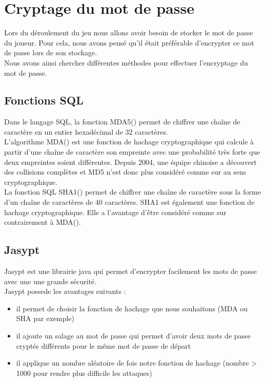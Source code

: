 \section{Cryptage du mot de passe}

Lors du déroulement du jeu nous allons avoir besoin de stocker le mot de passe du joueur. Pour cela, nous avons pensé qu'il était préférable d'encrypter ce mot de passe lors de son stockage. \\
Nous avons ainsi chercher différentes méthodes pour effectuer l'encryptage du mot de passe. 

\subsection{Fonctions SQL}

Dans le langage SQL, la fonction MDA5() permet de chiffrer une chaîne de caractère en un entier hexadécimal de 32 caractères. \\
L'algorithme MDA() est une fonction de hachage cryptographique qui calcule à partir d'une chaîne de caractère son empreinte avec une probabilité très forte que deux empreintes soient différentes. Depuis 2004, une équipe chinoise a découvert des collisions complètes et MD5 n'est donc plus considéré comme sur au sens cryptographique. \\

La fonction SQL SHA1() permet de chiffrer une chaîne de caractère sous la forme d'un chaîne de caractères de 40 caractères. SHA1 est également une fonction de hachage cryptographique. Elle a l'avantage d'être considéré comme sur contrairement à MDA(). 



\subsection{Jasypt}
Jasypt est une librairie java qui permet d'encrypter facilement les mots de passe avec une une grande sécurité. \\
Jasypt possede les avantages suivants :
\begin{itemize}
\item il permet de choisir la fonction de hachage que nous souhaitons (MDA ou SHA par exemple)
\item il ajoute un salage au mot de passe qui permet d'avoir deux mots de passe cryptés différents pour le même mot de passe de départ
\item il applique un nombre aléatoire de fois notre fonction de hachage (nombre > 1000 pour rendre plus difficile les attaques)
\end{itemize}  

